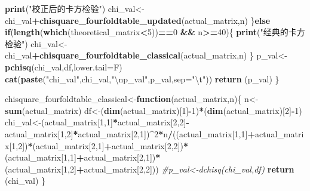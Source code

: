 \documentclass[
]{article}
\newenvironment{Shaded}{\begin{snugshade}}{\end{snugshade}}
\newcommand{\CharTok}[1]{\textcolor[rgb]{0.31,0.60,0.02}{#1}}
\newcommand{\CommentTok}[1]{\textcolor[rgb]{0.56,0.35,0.01}{\textit{#1}}}
\newcommand{\ControlFlowTok}[1]{\textcolor[rgb]{0.13,0.29,0.53}{\textbf{#1}}}
\newcommand{\DataTypeTok}[1]{\textcolor[rgb]{0.13,0.29,0.53}{#1}}
\newcommand{\DecValTok}[1]{\textcolor[rgb]{0.00,0.00,0.81}{#1}}
\newcommand{\KeywordTok}[1]{\textcolor[rgb]{0.13,0.29,0.53}{\textbf{#1}}}
\newcommand{\NormalTok}[1]{#1}
\newcommand{\OperatorTok}[1]{\textcolor[rgb]{0.81,0.36,0.00}{\textbf{#1}}}
\newcommand{\StringTok}[1]{\textcolor[rgb]{0.31,0.60,0.02}{#1}}
\begin{document}
\begin{Shaded}
\begin{Highlighting}[]
          \KeywordTok{print}\NormalTok{(}\StringTok{"校正后的卡方检验"}\NormalTok{)}
\NormalTok{          chi_val<-chi_val}\OperatorTok{+}\KeywordTok{chisquare_fourfoldtable_updated}\NormalTok{(actual_matrix,n)}
\NormalTok{     \}}\ControlFlowTok{else} \ControlFlowTok{if}\NormalTok{(}\KeywordTok{length}\NormalTok{(}\KeywordTok{which}\NormalTok{(theoretical_matrix}\OperatorTok{<}\DecValTok{5}\NormalTok{))}\OperatorTok{==}\DecValTok{0} \OperatorTok{&&}\StringTok{ }\NormalTok{n}\OperatorTok{>=}\DecValTok{40}\NormalTok{)\{}
          \KeywordTok{print}\NormalTok{(}\StringTok{"经典的卡方检验"}\NormalTok{)}
\NormalTok{          chi_val<-chi_val}\OperatorTok{+}\KeywordTok{chisquare_fourfoldtable_classical}\NormalTok{(actual_matrix,n)}
\NormalTok{     \}}
\NormalTok{     p_val<-}\KeywordTok{pchisq}\NormalTok{(chi_val,df,}\DataTypeTok{lower.tail=}\NormalTok{F)}
     \KeywordTok{cat}\NormalTok{(}\KeywordTok{paste}\NormalTok{(}\StringTok{"chi_val"}\NormalTok{,chi_val,}\StringTok{"}\CharTok{\textbackslash{}n}\StringTok{p_val"}\NormalTok{,p_val,}\DataTypeTok{sep=}\StringTok{"}\CharTok{\textbackslash{}t}\StringTok{"}\NormalTok{))}
     \KeywordTok{return}\NormalTok{ (p_val)}
\NormalTok{\}}

\NormalTok{chisquare_fourfoldtable_classical<-}\ControlFlowTok{function}\NormalTok{(actual_matrix,n)\{}
\NormalTok{     n<-}\KeywordTok{sum}\NormalTok{(actual_matrix)}
\NormalTok{     df<-(}\KeywordTok{dim}\NormalTok{(actual_matrix)[}\DecValTok{1}\NormalTok{]}\OperatorTok{-}\DecValTok{1}\NormalTok{)}\OperatorTok{*}\NormalTok{(}\KeywordTok{dim}\NormalTok{(actual_matrix)[}\DecValTok{2}\NormalTok{]}\OperatorTok{-}\DecValTok{1}\NormalTok{)}
\NormalTok{     chi_val<-(actual_matrix[}\DecValTok{1}\NormalTok{,}\DecValTok{1}\NormalTok{]}\OperatorTok{*}\NormalTok{actual_matrix[}\DecValTok{2}\NormalTok{,}\DecValTok{2}\NormalTok{]}\OperatorTok{-}\NormalTok{actual_matrix[}\DecValTok{1}\NormalTok{,}\DecValTok{2}\NormalTok{]}\OperatorTok{*}\NormalTok{actual_matrix[}\DecValTok{2}\NormalTok{,}\DecValTok{1}\NormalTok{])}\OperatorTok{^}\DecValTok{2}\OperatorTok{*}\NormalTok{n}\OperatorTok{/}\NormalTok{((actual_matrix[}\DecValTok{1}\NormalTok{,}\DecValTok{1}\NormalTok{]}\OperatorTok{+}\NormalTok{actual_matrix[}\DecValTok{1}\NormalTok{,}\DecValTok{2}\NormalTok{])}\OperatorTok{*}\NormalTok{(actual_matrix[}\DecValTok{2}\NormalTok{,}\DecValTok{1}\NormalTok{]}\OperatorTok{+}\NormalTok{actual_matrix[}\DecValTok{2}\NormalTok{,}\DecValTok{2}\NormalTok{])}\OperatorTok{*}\NormalTok{(actual_matrix[}\DecValTok{1}\NormalTok{,}\DecValTok{1}\NormalTok{]}\OperatorTok{+}\NormalTok{actual_matrix[}\DecValTok{2}\NormalTok{,}\DecValTok{1}\NormalTok{])}\OperatorTok{*}\NormalTok{(actual_matrix[}\DecValTok{1}\NormalTok{,}\DecValTok{2}\NormalTok{]}\OperatorTok{+}\NormalTok{actual_matrix[}\DecValTok{2}\NormalTok{,}\DecValTok{2}\NormalTok{]))}
     \CommentTok{#p_val<-dchisq(chi_val,df)}
     \KeywordTok{return}\NormalTok{ (chi_val)}
\NormalTok{\}}


\end{Highlighting}
\end{Shaded}
\end{document}
